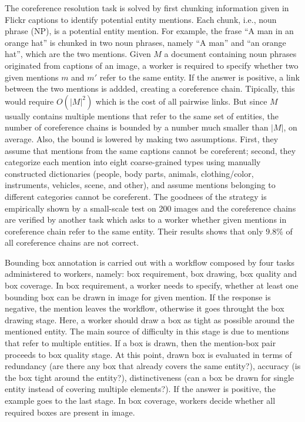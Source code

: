 The coreference resolution task is solved by first chunking
information given in Flickr captions to identify potential entity
mentions. Each chunk, i.e., noun phrase (NP), is a potential entity
mention. For example, the frase ``A man in an orange hat'' is chunked
in two noun phrases, namely ``A man'' and ``an orange hat'', which are
the two mentions. Given $M$ a document containing noun phrases
originated from captions of an image, a worker is required to specify
whether two given mentions $m$ and $m'$ refer to the same entity. If
the answer is positive, a link between the two mentions is addded,
creating a coreference chain. Tipically, this would require $O(|M|^2)$
which is the cost of all pairwise links. But since $M$ usually
contains multiple mentions that refer to the same set of entities, the
number of coreference chains is bounded by a number much smaller than
$|M|$, on average. Also, the bound is lowered by making two assumptions.
First, they assume that mentions from the same captions cannot be
coreferent; second, they categorize each mention into eight
coarse-grained types using manually constructed dictionaries (people,
body parts, animals, clothing/color, instruments, vehicles, scene, and
other), and assume mentions belonging to different categories cannot
be coreferent. The goodnees of the strategy is empirically shown by a
small-scale test on 200 images and the coreference chains are verified
by another task which asks to a worker whether given mentions in
coreference chain refer to the same entity. Their results shows that
only $9.8\%$ of all coreference chains are not correct.

Bounding box annotation is carried out with a workflow composed by
four tasks administered to workers, namely: box requirement, box
drawing, box quality and box coverage. In box requirement, a worker
needs to specify, whether at least one bounding box can be drawn in
image for given mention. If the response is negative, the mention
leaves the workflow, otherwise it goes throught the box drawing stage.
Here, a worker should draw a box as tight as possible around the
mentioned entity. The main source of difficulty in this stage is due
to mentions that refer to multiple entities. If a box is drawn, then
the mention-box pair proceeds to box quality stage. At this point,
drawn box is evaluated in terms of redundancy (are there any box that
already covers the same entity?), accuracy (is the box tight around
the entity?), distinctiveness (can a box be drawn for single entity
instead of covering multiple elements?). If the answer is positive,
the example goes to the last stage. In box coverage, workers decide
whether all required boxes are present in image. 

